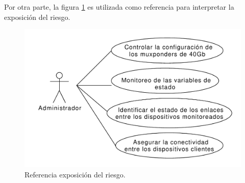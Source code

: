 Por otra parte, la figura \ref{fig:expo_riesgo} es utilizada como referencia para interpretar la exposición del riesgo.

\begin{figure}[H]
  \centering
  \includegraphics[scale=0.53]{Figures/caso_uso_admin.pdf}
  \caption{Referencia exposición del riesgo.}
  \label{fig:expo_riesgo}
\end{figure}